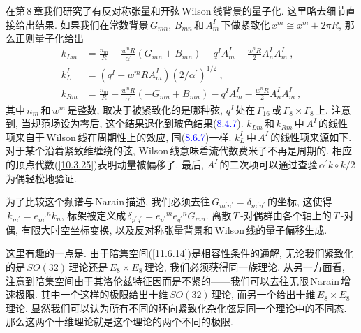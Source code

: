 在第\,8\,章我们研究了有反对称张量和开弦\,Wilson\,线背景的量子化. 这里略去细节直接给出结果. 如果我们在常数背景$\,G_{mn}$, $B_{mn}$\,和$\,A_{m}^{I}\,$下做紧致化$\,x^{m}\cong x^{m}+2\pi R$, 那么正则量子化给出
\begin{subequations}
\begin{align}
    k_{Lm}&= \frac{n_{m}}{R}+\frac{w^{n}R}{\alpha^{\prime}}(G_{mn}+B_{mn})-q^{I}A_{m}^{I}-\frac{w^{n}R}{2}A_{n}^{I}A_{m}^{I}\:,\label{11.6.17a}\\
    k_{L}^{I} &= (q^{I}+w^{m}RA_{m}^{I})(2/\alpha^{\prime})^{1/2} \:, \label{11.6.17b} \\
    k_{Rm}&= \frac{n_{m}}{R}+\frac{w^{n}R}{\alpha^{\prime}}(-G_{mn}+B_{mn})-q^{I}A_{m}^{I}-\frac{w^{n}R}{2}A_{n}^{I}A_{m}^{I}\:,\label{11.6.17c}
\end{align}
\end{subequations}
其中$\,n_{m}\,$和$\,w^{m}\,$是整数, 取决于被紧致化的是哪种弦, $q^{I}\,$处在$\,\Gamma_{16}\,$或$\,\Gamma_{8}\times\Gamma_{8}\,$上. 注意到, 当规范场设为零后, 这个结果退化到玻色结果(\textcolor{blue}{8.4.7}). $k_{Lm}\,$和$\,k_{Rm}\,$中$\,A^{I}\,$的线性项来自于\,Wilson\,线在周期性上的效应, 同(\textcolor{blue}{8.6.7})一样. $k_{L}^{I}\,$中$\,A^{I}\,$的线性项来源如下. 对于某个沿着紧致维缠绕的弦, Wilson\,线意味着流代数费米子不再是周期的. 相应的顶点代数(\ref{10.3.25})表明动量被偏移了. 最后, $A^{I}\,$的二次项可以通过查验$\,\alpha^{\prime}k\circ k/2\,$为偶轻松地验证.

为了比较这个频谱与\,Narain\,描述, 我们必须去往$\,G_{m^{\prime}n^{\prime}}=\delta_{m^{\prime}n^{\prime}}\,$的坐标, 这使得$\,k_{m^{\prime}}=e_{m^{\prime}}{}^{n}k_{n}$, 标架被定义成$\,\delta_{p^{\prime}q^{\prime}}=e_{p^{\prime}}{}^{m}e_{q^{\prime}}{}^{n}G_{mn}$. 离散\,$T$\,-对偶群由各个轴上的$\,T\,$-对偶, 有限大时空坐标变换, 以及反对称张量背景和\,Wilson\,线的量子偏移生成.

这里有趣的一点是. 由于陪集空间(\ref{11.6.14})是相容性条件的通解, 无论我们紧致化的是$\,SO(32)\,$理论还是$\,E_{8}\times E_{8}\,$理论, 我们必须获得同一族理论. 从另一方面看, 注意到陪集空间由于其洛伦兹特征因而是不紧的------我们可以去往无限\,Narain\,增速极限. 其中一个这样的极限给出十维$\,SO(32)\,$理论, 而另一个给出十维$\,E_{8}\times E_{8}\,$理论. 显然我们可以认为所有不同的环向紧致化杂化弦是同一个理论中的不同态. 那么这两个十维理论就是这个理论的两个不同的极限.

